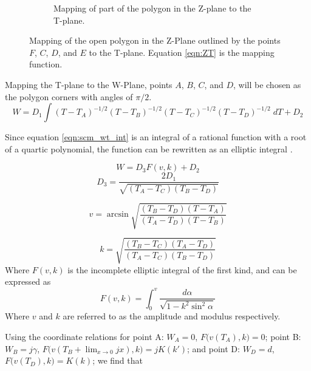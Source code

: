\begin{figure}[h]
\begin{subfigure}[t]{0.45\textwidth}
        \caption{Mapping of part of the polygon in the Z-plane to the T-plane.}
    \end{subfigure} 
    \caption[Mapping of the open polygon in the Z-Plane to the T-plane.]{Mapping of the open polygon in the Z-Plane outlined by the points $F$, $C$, $D$, and $E$ to the T-plane. Equation \ref{eqn:ZT} is the mapping function.} 
    \label{fig:Z_to_T_mapping}
 \end{figure}

 \par Mapping the T-plane to the W-Plane, points $A$, $B$, $C$, and $D$, will be chosen as the polygon corners with angles of $\pi/2$.
 \begin{equation}
    W = D_1 \int (T-T_A)^{-1/2}(T-T_B)^{-1/2}(T-T_C)^{-1/2}(T-T_D)^{-1/2}\;dT + D_2
    \label{eqn:scm_wt_int}
 \end{equation}
 
 \noindent Since equation \ref{eqn:scm_wt_int} is an integral of a rational function with a root of a quartic polynomial, the function can be rewritten as an elliptic integral \cite{i.s._gradshteyn_table_1980}.
 
 \begin{equation}
     W = D_3F(v,k) + D_2
 \end{equation}
 \begin{equation}
    D_3 = \frac{2D_1}{\sqrt{(T_A - T_C)(T_B-T_D)}}
 \end{equation}
 
 \begin{equation}
     v = \arcsin\sqrt{\frac{(T_B-T_D)(T-T_A)}{(T_A-T_D)(T-T_B)}}
 \end{equation}
 
 \begin{equation}
     k = \sqrt{\frac{(T_B-T_C)(T_A-T_D)}{(T_A-T_C)(T_B-T_D)}}
 \end{equation}
 \noindent Where $F(v,k)$ is the incomplete elliptic integral of the first kind, and can be expressed as
 \begin{equation}
     F(v,k) = \int^v_0 \frac{d\alpha}{\sqrt{1 - k^2\sin^2\alpha}}
 \end{equation}
 \noindent Where $v$ and $k$ are referred to as the amplitude and modulus respectively.
 
 \par Using the coordinate relations for point A: $W_A = 0$, $F\big(v(T_A),k\big) = 0$; point B: $W_B = j\gamma$, $F\big(v(T_B +\lim_{x\to 0} jx),k\big) = jK(k')$; and point D: $W_D = d$, $F\big(v(T_D),k\big) = K(k)$; we find that 
 
